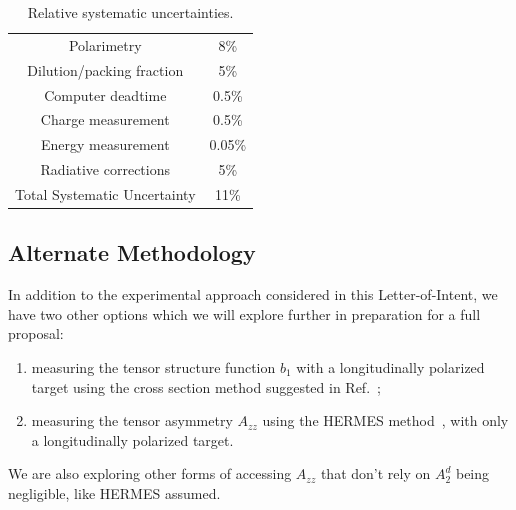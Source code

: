 \begin{table}
\begin{center}
\begin{tabular}{|cc|}\hline
Polarimetry                  &   8\%   \\
Dilution/packing fraction    &   5\%   \\
Computer deadtime            &  0.5\%  \\
Charge measurement           &  0.5\%  \\
Energy measurement           &  0.05\% \\
Radiative corrections        &   5\%   \\         
\hline
Total Systematic Uncertainty &  11\%   \\
\hline
\end{tabular}
\caption{\label{sys}Relative systematic uncertainties.}
\end{center}
\end{table}

\subsection{Alternate Methodology}

In addition to the experimental approach considered in this Letter-of-Intent, we 
 have two other options which we will explore further in preparation for a full proposal: 
\begin{enumerate}
 \item measuring the tensor structure function $b_1$ with a longitudinally polarized target
using the cross section method suggested in Ref.~\cite{Hoodbhoy:1988am};
 \item measuring the tensor asymmetry $A_{zz}$ using the HERMES method~\cite{Riedl:2005jq}, 
with only a longitudinally polarized target.
\end{enumerate}
We are also exploring other forms of accessing $A_{zz}$ that don't rely on $A_2^d$ 
being negligible, like HERMES assumed.
